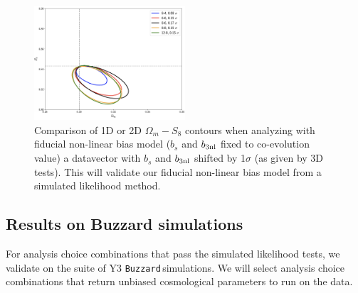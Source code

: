 \documentclass[fleqn,usenatbib]{mnras}
\newcommand{\gammat}{\ensuremath{\gamma_{t}(\theta)} }
\newcommand{\wtheta}{\ensuremath{w(\theta)} }
\newcommand{\lcdm}{$\Lambda$CDM}
\newcommand{\wcdm}{$w$CDM}
\newcommand{\buzzard}{\texttt{Buzzard}\,}
\begin{document}


\begin{figure}
\includegraphics[width=0.5\textwidth,draft]{figs/temp.png}
\caption[]{Comparison of 1D or 2D $\Omega_m-S_8$ contours when analyzing with fiducial non-linear bias model ($b_s$ and $b_{\rm 3nl}$ fixed to co-evolution value) a datavector with $b_s$ and $b_{\rm 3nl}$ shifted by 1$\sigma$ (as given by 3D tests). This will validate our fiducial non-linear bias model from a simulated likelihood method. }
\label{fig:nlbias_comp}
\end{figure}

\subsection{Results on Buzzard simulations}

For  analysis choice combinations that pass the simulated likelihood tests, we validate on the suite of Y3 \buzzard simulations. We will select analysis choice combinations that return unbiased cosmological parameters to run on the data. 
\end{document}
